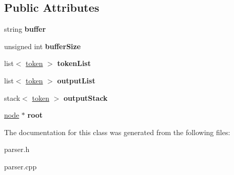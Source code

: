 \subsection*{\-Public \-Attributes}
\begin{DoxyCompactItemize}
\item 
\hypertarget{classparser_a66d29d00b3baf2d5f9e61870565a300d}{string {\bfseries buffer}}\label{classparser_a66d29d00b3baf2d5f9e61870565a300d}

\item 
\hypertarget{classparser_aa6d9186d9b525a5668b5bbf764e79c25}{unsigned int {\bfseries buffer\-Size}}\label{classparser_aa6d9186d9b525a5668b5bbf764e79c25}

\item 
\hypertarget{classparser_a7677f43cabd160a94be7f7aa505f70c9}{list$<$ \hyperlink{structtoken}{token} $>$ {\bfseries token\-List}}\label{classparser_a7677f43cabd160a94be7f7aa505f70c9}

\item 
\hypertarget{classparser_ae9fcbe9f0bf59445b85a51829cca7c74}{list$<$ \hyperlink{structtoken}{token} $>$ {\bfseries output\-List}}\label{classparser_ae9fcbe9f0bf59445b85a51829cca7c74}

\item 
\hypertarget{classparser_a8498b78769afa63da1b5ab16c94c80bb}{stack$<$ \hyperlink{structtoken}{token} $>$ {\bfseries output\-Stack}}\label{classparser_a8498b78769afa63da1b5ab16c94c80bb}

\item 
\hypertarget{classparser_ab7de4f749b1b2bed67c20a32d9ea11e8}{\hyperlink{classnode}{node} $\ast$ {\bfseries root}}\label{classparser_ab7de4f749b1b2bed67c20a32d9ea11e8}

\end{DoxyCompactItemize}


\-The documentation for this class was generated from the following files\-:\begin{DoxyCompactItemize}
\item 
parser.\-h\item 
parser.\-cpp\end{DoxyCompactItemize}
